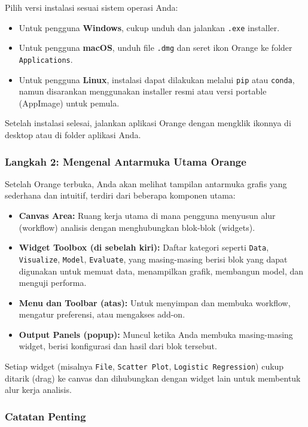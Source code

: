Pilih versi instalasi sesuai sistem operasi Anda:
\begin{itemize}
	\item Untuk pengguna \textbf{Windows}, cukup unduh dan jalankan \texttt{.exe} installer.
	\item Untuk pengguna \textbf{macOS}, unduh file \texttt{.dmg} dan seret ikon Orange ke folder \texttt{Applications}.
	\item Untuk pengguna \textbf{Linux}, instalasi dapat dilakukan melalui \texttt{pip} atau \texttt{conda}, namun disarankan menggunakan installer resmi atau versi portable (AppImage) untuk pemula.
\end{itemize}

Setelah instalasi selesai, jalankan aplikasi Orange dengan mengklik ikonnya di desktop atau di folder aplikasi Anda.

\subsubsection*{Langkah 2: Mengenal Antarmuka Utama Orange}

Setelah Orange terbuka, Anda akan melihat tampilan antarmuka grafis yang sederhana dan intuitif, terdiri dari beberapa komponen utama:

\begin{itemize}
	\item \textbf{Canvas Area:} Ruang kerja utama di mana pengguna menyusun alur (workflow) analisis dengan menghubungkan blok-blok (widgets).
	\item \textbf{Widget Toolbox (di sebelah kiri):} Daftar kategori seperti \texttt{Data}, \texttt{Visualize}, \texttt{Model}, \texttt{Evaluate}, yang masing-masing berisi blok yang dapat digunakan untuk memuat data, menampilkan grafik, membangun model, dan menguji performa.
	\item \textbf{Menu dan Toolbar (atas):} Untuk menyimpan dan membuka workflow, mengatur preferensi, atau mengakses add-on.
	\item \textbf{Output Panels (popup):} Muncul ketika Anda membuka masing-masing widget, berisi konfigurasi dan hasil dari blok tersebut.
\end{itemize}

Setiap widget (misalnya \texttt{File}, \texttt{Scatter Plot}, \texttt{Logistic Regression}) cukup ditarik (drag) ke canvas dan dihubungkan dengan widget lain untuk membentuk alur kerja analisis.

\subsubsection*{Catatan Penting}

